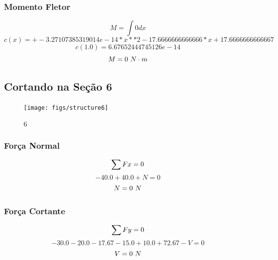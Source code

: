 \documentclass[a4paper,12pt]{article}%
\begin{document}
%
\subsubsection{Momento Fletor}%
\label{ssubsec:MomentoFletor}%
\begin{dmath*}%
M = \int0 dx%
\end{dmath*}%
\begin{dmath*}%
c(x) = +-3.27107385319014e-14*x**2 - 17.6666666666666*x + 17.6666666666667%
\end{dmath*}%
\begin{dmath*}%
c(1.0) = 6.67652444745126e-14%
\end{dmath*}%
\begin{dmath*}%
M = 0$ $N \cdot m%
\end{dmath*}

%
\subsection{Cortando na Seção 6}%
\label{subsec:CortandonaSeo6}%


\begin{figure}[H]%
\centering%
\texttt{[image: figs/structure6]}%
\caption{\label{fig:secoes}\label{fig:secoes} 6}%
\end{figure}

%
\subsubsection{Força Normal}%
\label{ssubsec:ForaNormal}%
\begin{dmath*}%
\sum{Fx} = 0 \\%
\end{dmath*}%
\begin{dmath*}%
-40.0 + 40.0 + N = 0%
\end{dmath*}%
\begin{dmath*}%
N = 0$ $N%
\end{dmath*}

%
\subsubsection{Força Cortante}%
\label{ssubsec:ForaCortante}%
\begin{dmath*}%
\sum{Fy} = 0 \\%
\end{dmath*}%
\begin{dmath*}%
-30.0 - 20.0 - 17.67 - 15.0 + 10.0 + 72.67 - V = 0%
\end{dmath*}%
\begin{dmath*}%
V = 0$ $N%
\end{dmath*}
\end{document}
